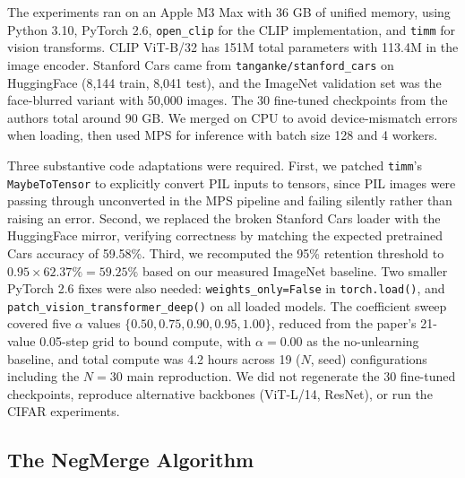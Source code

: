 \documentclass{article}
\begin{document}
The experiments ran on an Apple M3 Max with 36 GB of unified memory, using Python 3.10, PyTorch 2.6, \texttt{open\_clip} for the CLIP implementation, and \texttt{timm} for vision transforms. CLIP ViT-B/32 has 151M total parameters with 113.4M in the image encoder. Stanford Cars came from \texttt{tanganke/stanford\_cars} on HuggingFace (8,144 train, 8,041 test), and the ImageNet validation set was the face-blurred variant with 50,000 images. The 30 fine-tuned checkpoints from the authors total around 90 GB. We merged on CPU to avoid device-mismatch errors when loading, then used MPS for inference with batch size 128 and 4 workers.

Three substantive code adaptations were required. First, we patched \texttt{timm}'s \texttt{MaybeToTensor} to explicitly convert PIL inputs to tensors, since PIL images were passing through unconverted in the MPS pipeline and failing silently rather than raising an error. Second, we replaced the broken Stanford Cars loader with the HuggingFace mirror, verifying correctness by matching the expected pretrained Cars accuracy of 59.58\%. Third, we recomputed the 95\% retention threshold to $0.95 \times 62.37\% = 59.25\%$ based on our measured ImageNet baseline. Two smaller PyTorch 2.6 fixes were also needed: \texttt{weights\_only=False} in \texttt{torch.load()}, and \texttt{patch\_vision\_transformer\_deep()} on all loaded models. The coefficient sweep covered five $\alpha$ values $\{0.50, 0.75, 0.90, 0.95, 1.00\}$, reduced from the paper's 21-value 0.05-step grid to bound compute, with $\alpha = 0.00$ as the no-unlearning baseline, and total compute was 4.2 hours across 19 ($N$, seed) configurations including the $N = 30$ main reproduction. We did not regenerate the 30 fine-tuned checkpoints, reproduce alternative backbones (ViT-L/14, ResNet), or run the CIFAR experiments.

\subsection{The NegMerge Algorithm}
\end{document}
